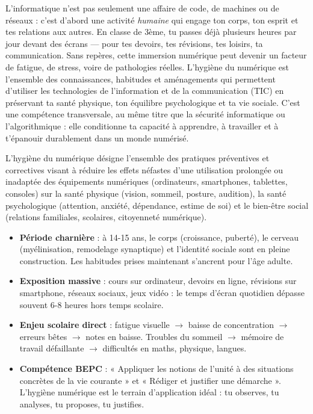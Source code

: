 \documentclass[11pt]{article}
\newcommand{\cle}[1]{{\popxbold\color{popdark}#1}}
\begin{document}
L'informatique n'est pas seulement une affaire de code, de machines ou de réseaux : c'est d'abord une activité \emph{humaine} qui engage ton corps, ton esprit et tes relations aux autres. En classe de 3ème, tu passes déjà plusieurs heures par jour devant des écrans — pour tes devoirs, tes révisions, tes loisirs, ta communication. Sans repères, cette immersion numérique peut devenir un facteur de fatigue, de stress, voire de pathologies réelles. L'\cle{hygiène du numérique} est l'ensemble des connaissances, habitudes et aménagements qui permettent d'utiliser les technologies de l'information et de la communication (TIC) en préservant ta santé physique, ton équilibre psychologique et ta vie sociale. C'est une compétence transversale, au même titre que la sécurité informatique ou l'algorithmique : elle conditionne ta capacité à apprendre, à travailler et à t'épanouir durablement dans un monde numérisé.

\begin{definition}
L'\cle{hygiène du numérique} désigne l'ensemble des pratiques préventives et correctives visant à réduire les effets néfastes d'une utilisation prolongée ou inadaptée des équipements numériques (ordinateurs, smartphones, tablettes, consoles) sur la santé physique (vision, sommeil, posture, audition), la santé psychologique (attention, anxiété, dépendance, estime de soi) et le bien-être social (relations familiales, scolaires, citoyenneté numérique).
\end{definition}

\begin{aretenir}
\begin{itemize}
    \item \textbf{Période charnière} : à 14-15 ans, le corps (croissance, puberté), le cerveau (myélinisation, remodelage synaptique) et l'identité sociale sont en pleine construction. Les habitudes prises maintenant s'ancrent pour l'âge adulte.
    \item \textbf{Exposition massive} : cours sur ordinateur, devoirs en ligne, révisions sur smartphone, réseaux sociaux, jeux vidéo : le temps d'écran quotidien dépasse souvent 6-8 heures hors temps scolaire.
    \item \textbf{Enjeu scolaire direct} : fatigue visuelle $\rightarrow$ baisse de concentration $\rightarrow$ erreurs bêtes $\rightarrow$ notes en baisse. Troubles du sommeil $\rightarrow$ mémoire de travail défaillante $\rightarrow$ difficultés en maths, physique, langues.
    \item \textbf{Compétence BEPC} : « Appliquer les notions de l'unité à des situations concrètes de la vie courante » et « Rédiger et justifier une démarche ». L'hygiène numérique est le terrain d'application idéal : tu observes, tu analyses, tu proposes, tu justifies.
\end{itemize}
\end{aretenir}
\end{document}
